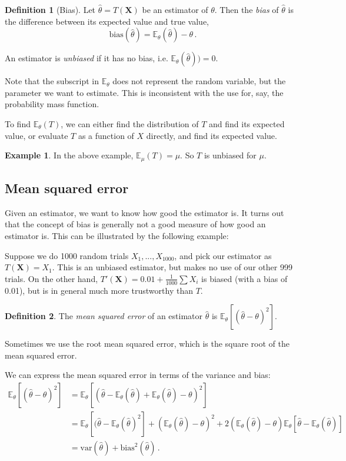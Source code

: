 \documentclass[a4paper,11pt]{article}
\theoremstyle{definition}
\newtheorem*{defn}{Definition}
\newtheorem*{ex}{Example}
\numberwithin{equation}{section}
\begin{document}
\begin{defn}[Bias]
Let $\hat{\theta}=T(\mathbf{X})$ be an estimator of $\theta$. Then the \emph{bias} of $\hat{\theta}$ is the difference between its expected value and true value,
\[
\text{bias}(\hat{\theta})=\mathbb{E}_\theta(\hat{\theta})-\theta\,.
\]

An estimator is \emph{unbiased} if it has no bias, i.e. $\mathbb{E}_\theta(\hat{\theta}))=0$.
\end{defn}

Note that the subscript in $\mathbb{E}_\theta$ does not represent the random variable, but the parameter we want to estimate. This is inconsistent with the use for, say, the probability mass function.

To find $\mathbb{E}_\theta(T)$, we can either find the distribution of $T$ and find its expected value, or evaluate $T$ as a function of $X$ directly, and find its expected value.

\begin{ex}
In the above example, $\mathbb{E}_\mu(T)=\mu$. So $T$ is unbiased for $\mu$.
\end{ex}

\subsection{Mean squared error}
Given an estimator, we want to know how good the estimator is. It turns out that the concept of bias is generally not a good measure of how good an estimator is. This can be illustrated by the following example:

Suppose we do 1000 random trials $X_1,...,X_{1000}$, and pick our estimator as $T(\mathbf{X})=X_1$. This is an unbiased estimator, but makes no use of our other 999 trials. On the other hand, $T'(\mathbf{X})=0.01+\frac{1}{1000}\sum X_i$ is biased (with a bias of 0.01), but is in general much more trustworthy than $T$. 

\begin{defn}
The \emph{mean squared error} of an estimator $\hat{\theta}$ is $\mathbb{E}_\theta[(\hat{\theta}-\theta)^2]$.

Sometimes we use the root mean squared error, which is the square root of the mean squared error.
\end{defn}

We can express the mean squared error in terms of the variance and bias:
\begin{align*}
\mathbb{E}_\theta[(\hat{\theta}-\theta)^2]&=\mathbb{E}_\theta[(\hat{\theta}-\mathbb{E}_\theta(\hat{\theta})+\mathbb{E}_\theta(\hat{\theta})-\theta)^2]\\
&=\mathbb{E}_\theta[(\hat{\theta}-\mathbb{E}_\theta(\hat{\theta})^2]+(\mathbb{E}_\theta(\hat{\theta})-\theta)^2+2(\mathbb{E}_\theta(\hat{\theta})-\theta)\mathbb{E}_\theta[\hat{\theta}-\mathbb{E}_\theta(\hat{\theta})]\\
&=\text{var}(\hat{\theta})+\text{bias}^2(\hat{\theta})\,.
\end{align*}
\end{document}
